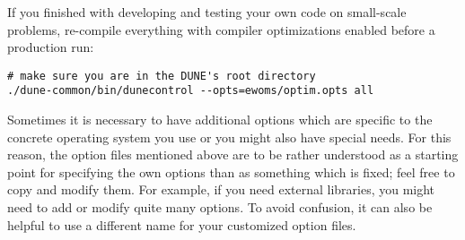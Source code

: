 If you finished with developing and testing your own code on
small-scale problems, re-compile everything with compiler
optimizations enabled before a production run:

\begin{lstlisting}[style=Bash]
# make sure you are in the DUNE's root directory
./dune-common/bin/dunecontrol --opts=ewoms/optim.opts all
\end{lstlisting}

Sometimes it is necessary to have additional options which are
specific to the concrete operating system you use or you might also
have special needs.  For this reason, the option files mentioned above
are to be rather understood as a starting point for specifying the own
options than as something which is fixed; feel free to copy and modify
them.  For example, if you need external libraries, you might need to
add or modify quite many options.  To avoid confusion, it can also be
helpful to use a different name for your customized option files.

